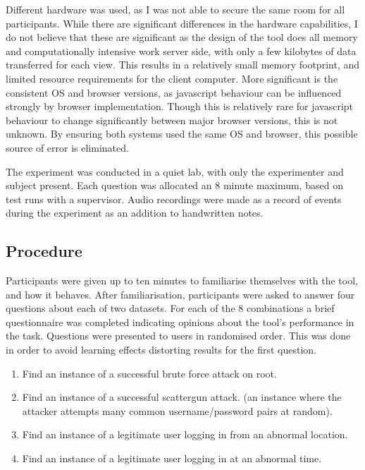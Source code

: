 Different hardware was used, as I was not able to secure the same room for all participants. 
While there are significant differences in the hardware capabilities, I do not believe that these are significant
as the design of the tool does all memory and computationally intensive work server side, with only a few kilobytes of data transferred for each view. This results in a relatively small memory footprint, and limited resource requirements for the client computer.
More significant is the consistent OS and browser versions, as javascript behaviour can be influenced strongly by browser implementation. Though this is relatively rare for javascript behaviour to change significantly between major browser versions, this is not unknown. By ensuring both systems used the same OS and browser, this possible source of error is eliminated.

The experiment was conducted in a quiet lab, with only the experimenter and subject present. Each question was allocated an 8 minute maximum, based on test runs with a supervisor. Audio recordings were made as a record of events during the experiment as an addition to handwritten notes. 

\subsection{Procedure}
Participants were given up to ten minutes to familiarise themselves with the tool, and how it behaves. After familiarisation, participants were asked to answer four questions about each of two datasets. For each of the 8 combinations a brief questionnaire was completed indicating opinions about the tool's performance in the task\cite{lewis1995ibm}.
Questions were presented to users in randomised order. This was done in order to avoid learning effects distorting results for the first question.

\begin{enumerate}
\item{Find an instance of a successful brute force attack on root.}
\item{Find an instance of a successful scattergun attack.
(an instance where the attacker attempts many common username/password pairs at random).}
\item{Find an instance of a legitimate user logging in from an abnormal location.}
\item{Find an instance of a legitimate user logging in at an abnormal time.}
\end{enumerate}

